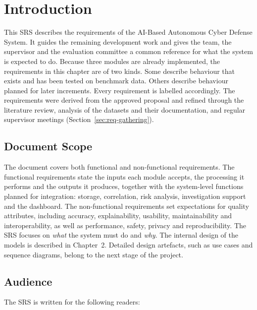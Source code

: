 \section{Introduction}

This SRS describes the requirements of the AI-Based Autonomous Cyber Defense System. It guides the remaining development work and gives the team, the supervisor and the evaluation committee a common reference for what the system is expected to do. Because three modules are already implemented, the requirements in this chapter are of two kinds. Some describe behaviour that exists and has been tested on benchmark data. Others describe behaviour planned for later increments. Every requirement is labelled accordingly. The requirements were derived from the approved proposal and refined through the literature review, analysis of the datasets and their documentation, and regular supervisor meetings (Section~\ref{sec:req-gathering}).

\subsection{Document Scope}

The document covers both functional and non-functional requirements. The functional requirements state the inputs each module accepts, the processing it performs and the outputs it produces, together with the system-level functions planned for integration: storage, correlation, risk analysis, investigation support and the dashboard. The non-functional requirements set expectations for quality attributes, including accuracy, explainability, usability, maintainability and interoperability, as well as performance, safety, privacy and reproducibility. The SRS focuses on \textit{what} the system must do and \textit{why}. The internal design of the models is described in Chapter~2. Detailed design artefacts, such as use cases and sequence diagrams, belong to the next stage of the project.

\subsection{Audience}

The SRS is written for the following readers:

